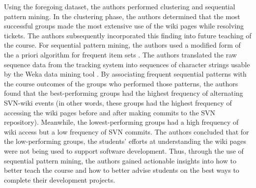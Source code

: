 Using the foregoing dataset, the authors performed clustering and sequential pattern mining.  In the clustering phase, the authors determined that the most successful groups made the most extensive use of the wiki pages while resolving tickets.  The authors subsequently incorporated this finding into future teaching of the course.  For sequential pattern mining, the authors used a modified form of the a priori algorithm for frequent item sets \cite[Section 6.1]{Perera}.  The authors translated the raw sequence data from the tracking system into sequences of character strings usable by the Weka data mining tool \cite[Table 9]{Perera}.  By associating frequent sequential patterns with the course outcomes of the groups who performed those patterns,  the authors found that the best-performing groups had the highest frequency of alternating SVN-wiki events (in other words, these groups had the highest frequency of accessing the wiki pages before and after making commits to the SVN repository).  Meanwhile, the lowest-performing groups had a high frequency of wiki access but a low frequency of SVN commits.  The authors concluded that for the low-performing groups, the students' efforts at understanding the wiki pages were not being used to support software development.  Thus, through the use of sequential pattern mining, the authors gained actionable insights into how to better teach the course and how to better advise students on the best ways to complete their development projects.

